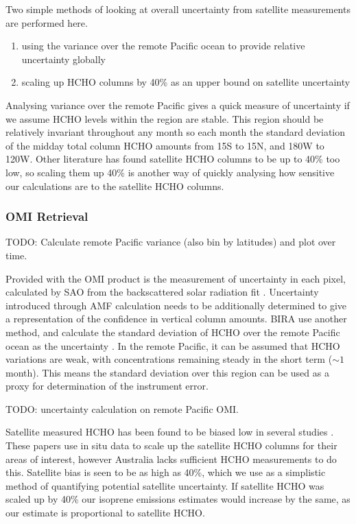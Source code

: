     
    Two simple methods of looking at overall uncertainty from satellite measurements are performed here.
    \begin{enumerate}
      \item using the variance over the remote Pacific ocean to provide relative uncertainty globally \parencite[e.g.][]{DeSmedt2012}
      \item scaling up HCHO columns by 40\% as an upper bound on satellite uncertainty
    \end{enumerate}
    Analysing variance over the remote Pacific gives a quick measure of uncertainty if we assume HCHO levels within the region are stable.
    This region should be relatively invariant throughout any month so each month the standard deviation of the midday total column HCHO amounts from 15\degr S to 15\degr N, and 180\degr W to 120\degr W.
    Other literature has found satellite HCHO columns to be up to 40\% too low, so scaling them up 40\% is another way of quickly analysing how sensitive our calculations are to the satellite HCHO columns.
    
    
    \subsubsection{OMI Retrieval}
      \label{BioIsop:uncertainty:Satellite:retrieval}
      TODO: Calculate remote Pacific variance (also bin by latitudes) and plot over time. 
      
      
      Provided with the OMI product is the measurement of uncertainty in each pixel, calculated by SAO from the backscattered solar radiation fit \parencite{Abad2015,Abad2016}.
      Uncertainty introduced through AMF calculation needs to be additionally determined to give a representation of the confidence in vertical column amounts.
      BIRA use another method, and calculate the standard deviation of HCHO over the remote Pacific ocean as the uncertainty \parencite{DeSmedt2012, DeSmedt2015}.
      In the remote Pacific, it can be assumed that HCHO variations are weak, with concentrations remaining steady in the short term ($\sim 1$ month).
      This means the standard deviation over this region can be used as a proxy for determination of the instrument error.
      
      
      TODO: uncertainty calculation on remote Pacific OMI.
      
      Satellite measured HCHO has been found to be biased low in several studies \parencite[e.g.][]{Zhu2016,DeSmedt2015,Barkley2013}.
      These papers use in situ data to scale up the satellite HCHO columns for their areas of interest, however Australia lacks sufficient HCHO measurements to do this.
      Satellite bias is seen to be as high as 40\%, which we use as a simplistic method of quantifying potential satellite uncertainty.
      If satellite HCHO was scaled up by 40\% our isoprene emissions estimates would increase by the same, as our estimate is proportional to satellite HCHO.
      
